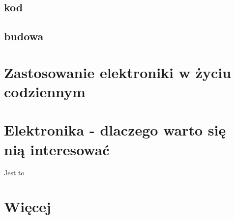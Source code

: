 	\section{kod}
	\section{budowa}
\chapter {Zastosowanie elektroniki w życiu codziennym }
\chapter{Elektronika - dlaczego warto się nią interesować}
Jest to 
\chapter {Więcej}
%





